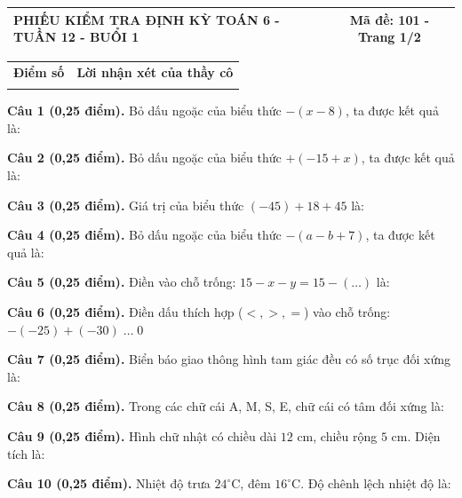 \documentclass[12pt,a4paper]{article}
\begin{document}
\pagestyle{empty}
\noindent
\begin{tabularx}{\linewidth}{|X|c|}
\hline
\textbf{PHIẾU KIỂM TRA ĐỊNH KỲ TOÁN 6 - TUẦN 12 - BUỔI 1} & \textbf{Mã đề: 101 - Trang 1/2} \\
\hline
\end{tabularx}

\vspace{1.0mm}

\noindent
\begin{tabularx}{\linewidth}{|p{3.2cm}|X|}
\hline
\centering\textbf{Điểm số} & \centering\textbf{Lời nhận xét của thầy cô} \tabularnewline
\rule{0pt}{1.8cm} & \\
\hline
\end{tabularx}

\vspace{1.0mm}
\noindent\textbf{Câu 1 (0,25 điểm).} Bỏ dấu ngoặc của biểu thức $-(x - 8)$, ta được kết quả là: \par\vspace{0.25mm}
\noindent\textbf{Câu 2 (0,25 điểm).} Bỏ dấu ngoặc của biểu thức $+(-15 + x)$, ta được kết quả là: \par\vspace{0.25mm}
\noindent\textbf{Câu 3 (0,25 điểm).} Giá trị của biểu thức $(-45) + 18 + 45$ là: \par\vspace{0.25mm}
\noindent\textbf{Câu 4 (0,25 điểm).} Bỏ dấu ngoặc của biểu thức $-(a - b + 7)$, ta được kết quả là: \par\vspace{0.25mm}
\noindent\textbf{Câu 5 (0,25 điểm).} Điền vào chỗ trống: $15 - x - y = 15 - (\dots)$ là: \par\vspace{0.25mm}
\noindent\textbf{Câu 6 (0,25 điểm).} Điền dấu thích hợp ($<, >, =$) vào chỗ trống: $-(-25) + (-30) \; \dots \; 0$ \shortans{<}\par\vspace{0.25mm}
\noindent\textbf{Câu 7 (0,25 điểm).} Biển báo giao thông hình tam giác đều có số trục đối xứng là: \par\vspace{0.25mm}
\noindent\textbf{Câu 8 (0,25 điểm).} Trong các chữ cái A, M, S, E, chữ cái có tâm đối xứng là: \par\vspace{0.25mm}
\noindent\textbf{Câu 9 (0,25 điểm).} Hình chữ nhật có chiều dài $12\text{ cm}$, chiều rộng $5\text{ cm}$. Diện tích là: \par\vspace{0.25mm}
\noindent\textbf{Câu 10 (0,25 điểm).} Nhiệt độ trưa $24^\circ\text{C}$, đêm $16^\circ\text{C}$. Độ chênh lệch nhiệt độ là: \par\vspace{0.25mm}
\end{document}
